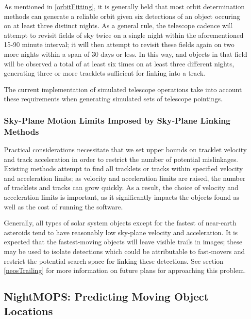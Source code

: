 \documentclass[12pt,preprint]{aastex}
\begin{document}
As mentioned in \ref{orbitFitting}, it is generally held that most
orbit determination methods can generate a reliable orbit given six
detections of an object occuring on at least three distinct nights.
As a general rule, the telescope cadence will attempt to revisit
fields of sky twice on a single night within the aforementioned 15-90
minute interval; it will then attempt to revisit these fields again on
two more nights within a span of 30 days or less.  In this way, and
objects in that field will be observed a total of at least six times
on at least three different nights, generating three or more tracklets
sufficient for linking into a track.


The current implementation of simulated telescope operations
take into account these requirements when generating simulated sets of
telescope pointings. 


\subsubsection{Sky-Plane Motion Limits Imposed by Sky-Plane Linking Methods}

Practical considerations necessitate that we set upper bounds on
tracklet velocity and track acceleration in order to restrict the
number of potential mislinkages. Existing methods attempt to find all
tracklets or tracks within specified velocity and acceleration limits;
as velocity and acceleration limits are raised, the number of
tracklets and tracks can grow quickly.  As a result, the choice of
velocity and acceleration limits is important, as it significantly
impacts the objects found as well as the cost of running the software.

Generally, all types of solar system objects except for the fastest of
near-earth asteroids tend to have reasonably low sky-plane velocity
and acceleration. It is expected that the fastest-moving objects will
leave visible trails in images; these may be used to isolate
detections which could be attributable to fast-movers and restrict the
potential search space for linking these detections.  See section
\ref{neosTrailing} for more information on future plans for
approaching this problem.  





\subsection{NightMOPS: Predicting Moving Object Locations}
\end{document}
